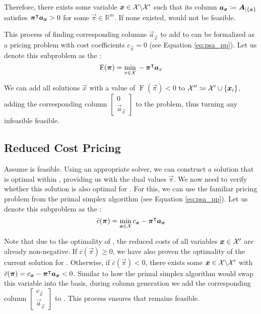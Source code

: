 Therefore, there exists some variable ${\bm{x}} \in \mathcal{X} \backslash \mathcal{X}'$ such that its column ${\bm{a}}_{\bm{x}} \coloneqq {\bm{A}}_{\vert \{{\bm{x}}\}}$ satisfies ${\bm{\pi}}^\intercal {\bm{a}}_{\bm{x}} > 0$ for some $\vec{\pi} \in \mathbb{R}^m$. If none existed, \MP{} would not be feasible.

This process of finding corresponding columns $\vec{a}_\vec{x}$ to add to \RMP{} can be formalized as a pricing problem with cost coefficients $c_\vec{x} = 0$ (see Equation \eqref{eq:psa_pp}). Let us denote this subproblem as the \FP{}:
\begin{equation}
\operatorname{F}({\bm{\pi}}) = \underset{x \in \mathcal{X}}{\min} \, -{\bm{\pi}}^\intercal {\bm{a}}_x
\end{equation}

We can add all solutions $\vec{x}$ with a value of $\operatorname{F}(\vec{\pi}) < 0$ to $\mathcal{X}'' \coloneqq \mathcal{X}' \cup \{{\bm{x}}_i\}$, adding the corresponding column $\begin{bmatrix}0 \\ \vec{a}_\vec{x} \end{bmatrix}$ to the problem, thus turning any infeasible \RMP{} feasible.

\subsection{Reduced Cost Pricing}\label{sec:cg_bp_cg_reduced}
Assume \RMP{} is feasible. Using an appropriate solver, we can construct a solution that is optimal within \RMP{}, providing us with the dual values $\vec{\pi}$. We now need to verify whether this solution is also optimal for \MP{}. For this, we can use the familiar pricing problem from the primal simplex algorithm (see Equation \eqref{eq:psa_pp}). Let us denote this subproblem as the \RCP{}:
\begin{equation}
\bar{c}(\vec{\pi}) = \underset{\vec{x} \in \indexset{X}}{\min} \, c_\vec{x} - \vec{\pi}\transpose \vec{a}_\vec{x}
\end{equation}

Note that due to the optimality of \RMP{}, the reduced costs of all variables ${\bm{x}} \in \mathcal{X}'$ are already non-negative. If $\bar{c}(\vec{\pi}) \geq 0$, we have also proven the optimality of the current solution for \MP{}. Otherwise, if $\bar{c}(\vec{\pi}) < 0$, there exists some ${\bm{x}} \in \mathcal{X} \backslash \mathcal{X}'$ with $\bar{c}(\vec{\pi}) = c_\vec{x} - \vec{\pi}\transpose \vec{a}_\vec{x} < 0$. Similar to how the primal simplex algorithm would swap this variable into the basis, during column generation we add the corresponding column $\begin{bmatrix} c_\vec{x} \\ \vec{a}_\vec{x} \end{bmatrix}$ to \RMP{}. This process ensures that \RMP{} remains feasible.

